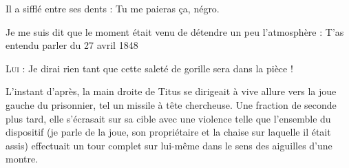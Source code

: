 \begin{dialogue}

Il a sifflé entre ses dents : Tu me paieras ça, négro.

Je me suis dit que le moment était venu de détendre un peu l’atmosphère : T’as entendu parler du 27 avril 1848

%

\textsc{Lui} : Je dirai rien tant que cette saleté de gorille sera dans la pièce !

\end{dialogue}

L’instant d’après, la main droite de Titus se dirigeait à vive allure vers la joue gauche du prisonnier, tel un missile à tête chercheuse. Une fraction de seconde plus tard, elle s’écrasait sur sa cible avec une violence telle que l’ensemble du dispositif (je parle de la joue, son propriétaire et la chaise sur laquelle il était assis) effectuait un tour complet sur lui-même dans le sens des aiguilles d’une montre.

